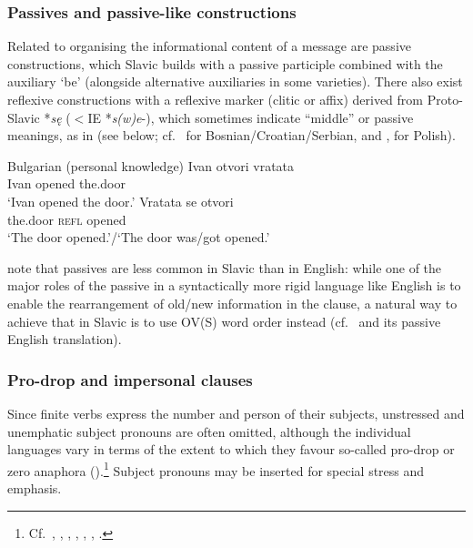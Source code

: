 \documentclass[output=paper,hidelinks]{langscibook}
\begin{document}
\subsubsection{Passives and passive-like constructions}
\label{sec:Slavic:1.2.3}

Related to organising the informational content of a message are passive constructions, which Slavic builds with a passive participle combined with the auxiliary `be' (alongside alternative auxiliaries in some varieties). There also exist reflexive constructions with a reflexive marker (clitic or affix) derived from Proto-Slavic *\textit{sę} ($<$\/IE *\textit{s(w)e}{}-), which sometimes indicate ``middle'' or passive meanings, as in  (see  below; cf.\ \citealt[333]{Browne1993} for Bosnian/Croatian/Serbian, \citealt[712--714]{Rothstein1993}  and \citealt[Section~3]{Kibort2006}, for Polish).

\ea Bulgarian (personal knowledge)%
\label{ex:Slavic:2}
\ea\label{ex:Slavic:2a}
    \gll Ivan   otvori     vratata\\
        Ivan  opened    the.door\\
    \glt `Ivan opened the door.' 
\ex\label{ex:Slavic:2b}
    \gll Vratata   se   otvori\\
        the.door   \textsc{refl}   opened\\
    \glt `The door opened.'/`The door was/got opened.'
    \z\z

\citet[369]{SussexCubberley2006} note that passives are less common in Slavic than in English: while one of the major roles of the passive in a syntactically more rigid language like English is to enable the rearrangement of old/new information in the clause, a natural way to achieve that in Slavic is to use OV(S) word order instead (cf.\  and its passive English translation).

\subsubsection{Pro-drop and impersonal clauses}
\label{sec:Slavic:1.2.4}

Since finite verbs express the number and person of their subjects, unstressed and unemphatic subject pronouns are often omitted, although the individual languages vary in terms of the extent to which they favour so-called pro-drop or zero anaphora (\citealt[7]{ComrieCorbett1993}).\footnote{Cf.\ \citet[365--366]{Browne1993}, \citet[175]{Huntley1993}, \citet[742]{Rothstein1993}, \citet[234]{Scatton1993}, \citet[871--872]{Timberlake1993}, \citet[17, 21--22, 69]{King95}, \citet[402]{SussexCubberley2006}.} Subject pronouns may be inserted for special stress and emphasis.
\end{document}
